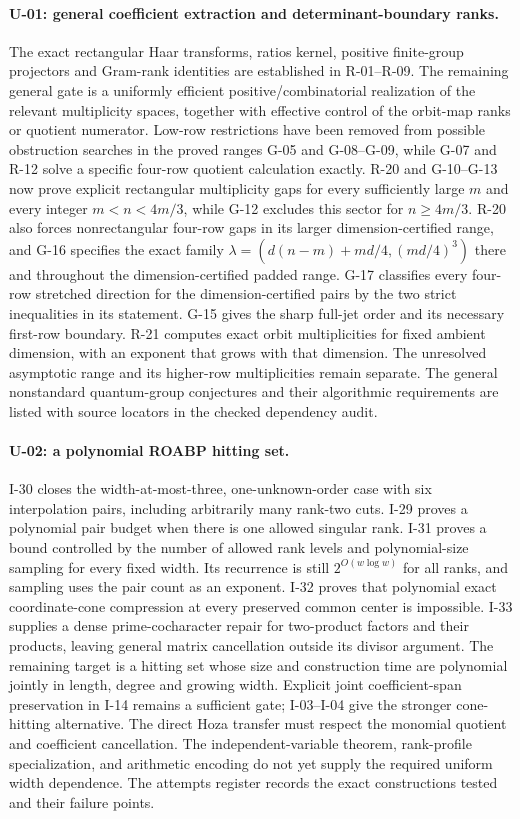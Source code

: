 \documentclass[11pt,a4paper]{article}
\theoremstyle{definition}\newtheorem{definition}{Definition}
\begin{document}
\paragraph{U-01: general coefficient extraction and determinant-boundary ranks.}
The exact rectangular Haar transforms, ratios kernel, positive finite-group projectors and Gram-rank identities are established in R-01--R-09. The remaining general gate is a uniformly efficient positive/combinatorial realization of the relevant multiplicity spaces, together with effective control of the orbit-map ranks or quotient numerator. Low-row restrictions have been removed from possible obstruction searches in the proved ranges G-05 and G-08--G-09, while G-07 and R-12 solve a specific four-row quotient calculation exactly. R-20 and G-10--G-13 now prove explicit rectangular multiplicity gaps for every sufficiently large $m$ and every integer $m<n<4m/3$, while G-12 excludes this sector for $n\geq4m/3$. R-20 also forces nonrectangular four-row gaps in its larger dimension-certified range, and G-16 specifies the exact family $\lambda=(d(n-m)+md/4,(md/4)^3)$ there and throughout the dimension-certified padded range. G-17 classifies every four-row stretched direction for the dimension-certified pairs by the two strict inequalities in its statement. G-15 gives the sharp full-jet order and its necessary first-row boundary. R-21 computes exact orbit multiplicities for fixed ambient dimension, with an exponent that grows with that dimension. The unresolved asymptotic range and its higher-row multiplicities remain separate. The general nonstandard quantum-group conjectures and their algorithmic requirements are listed with source locators in the checked dependency audit.

\paragraph{U-02: a polynomial ROABP hitting set.}
I-30 closes the width-at-most-three, one-unknown-order case with six interpolation pairs, including arbitrarily many rank-two cuts. I-29 proves a polynomial pair budget when there is one allowed singular rank. I-31 proves a bound controlled by the number of allowed rank levels and polynomial-size sampling for every fixed width. Its recurrence is still $2^{O(w\log w)}$ for all ranks, and sampling uses the pair count as an exponent. I-32 proves that polynomial exact coordinate-cone compression at every preserved common center is impossible. I-33 supplies a dense prime-cocharacter repair for two-product factors and their products, leaving general matrix cancellation outside its divisor argument. The remaining target is a hitting set whose size and construction time are polynomial jointly in length, degree and growing width. Explicit joint coefficient-span preservation in I-14 remains a sufficient gate; I-03--I-04 give the stronger cone-hitting alternative. The direct Hoza transfer must respect the monomial quotient and coefficient cancellation. The independent-variable theorem, rank-profile specialization, and arithmetic encoding do not yet supply the required uniform width dependence. The attempts register records the exact constructions tested and their failure points.
\end{document}
